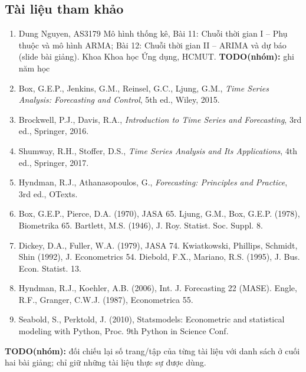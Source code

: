 \documentclass[12pt,a4paper]{article}
\newcommand{\TODO}[1]{{\color{red}\textbf{TODO(nhóm):} #1}}
\begin{document}
\subsection*{Tài liệu tham khảo}
\begin{enumerate}
\item Dung Nguyen, AS3179 Mô hình thống kê, Bài 11: Chuỗi thời gian I -- Phụ thuộc và mô hình ARMA; Bài 12: Chuỗi thời gian II -- ARIMA và dự báo (slide bài giảng). Khoa Khoa học Ứng dụng, HCMUT. \TODO{ghi năm học}
\item Box, G.E.P., Jenkins, G.M., Reinsel, G.C., Ljung, G.M., \textit{Time Series Analysis: Forecasting and Control}, 5th ed., Wiley, 2015.
\item Brockwell, P.J., Davis, R.A., \textit{Introduction to Time Series and Forecasting}, 3rd ed., Springer, 2016.
\item Shumway, R.H., Stoffer, D.S., \textit{Time Series Analysis and Its Applications}, 4th ed., Springer, 2017.
\item Hyndman, R.J., Athanasopoulos, G., \textit{Forecasting: Principles and Practice}, 3rd ed., OTexts.
\item Box, G.E.P., Pierce, D.A. (1970), JASA 65. \quad Ljung, G.M., Box, G.E.P. (1978), Biometrika 65. \quad Bartlett, M.S. (1946), J. Roy. Statist. Soc. Suppl. 8.
\item Dickey, D.A., Fuller, W.A. (1979), JASA 74. \quad Kwiatkowski, Phillips, Schmidt, Shin (1992), J. Econometrics 54. \quad Diebold, F.X., Mariano, R.S. (1995), J. Bus. Econ. Statist. 13.
\item Hyndman, R.J., Koehler, A.B. (2006), Int. J. Forecasting 22 (MASE). \quad Engle, R.F., Granger, C.W.J. (1987), Econometrica 55.
\item Seabold, S., Perktold, J. (2010), Statsmodels: Econometric and statistical modeling with Python, Proc. 9th Python in Science Conf.
\end{enumerate}
\TODO{đối chiếu lại số trang/tập của từng tài liệu với danh sách ở cuối hai bài giảng; chỉ giữ những tài liệu thực sự được dùng.}
\end{document}
